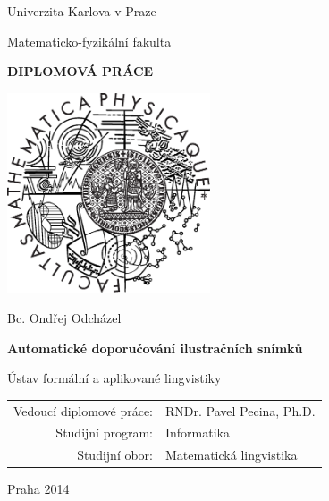 \documentclass[12pt,a4paper]{report}
\begin{document}
\pagestyle{empty}
\begin{center}

\large

Univerzita Karlova v Praze

\medskip

Matematicko-fyzikální fakulta

\vfill

{\bf\Large DIPLOMOVÁ PRÁCE}

\vfill

\centerline{\mbox{\includegraphics[width=60mm]{logo.eps}}}

\vfill
\vspace{5mm}

{\LARGE Bc. Ondřej Odcházel}

\vspace{15mm}

{\LARGE\bfseries Automatické doporučování ilustračních snímků}

\vfill

Ústav formální a aplikované lingvistiky

\vfill

\begin{tabular}{rl}

Vedoucí diplomové práce: & RNDr. Pavel Pecina, Ph.D. \\
\noalign{\vspace{2mm}}
Studijní program: & Informatika \\
\noalign{\vspace{2mm}}
Studijní obor: & Matematická lingvistika \\
\end{tabular}

\vfill

Praha 2014

\end{center}
\end{document}
